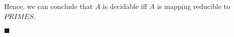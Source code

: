 \documentclass[a4paper]{exam}
\begin{document}
\begin{questions}
\begin{solution}
    Hence, we can conclude that $A$ is decidable iff $A$ is mapping reducible to $PRIMES$. \vspace*{-4mm}
    \begin{flushright}
      $ \blacksquare $
    \end{flushright}
  \end{solution}
\end{questions}
\end{document}

